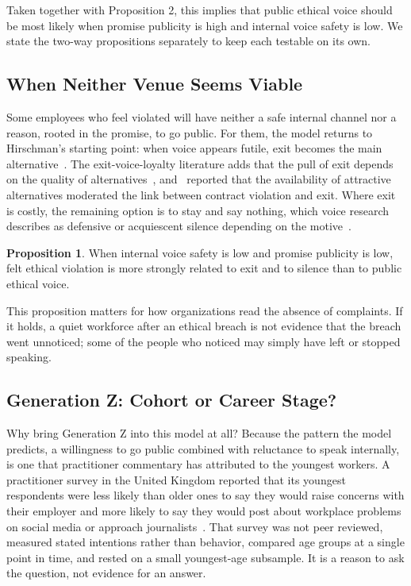 \documentclass[12pt,a4paper]{article}
\theoremstyle{definition}
\newtheorem{proposition}{Proposition}
\begin{document}
Taken together with Proposition 2, this implies that public ethical voice should be most likely when promise publicity is high and internal voice safety is low. We state the two-way propositions separately to keep each testable on its own.

\subsection{When Neither Venue Seems Viable}

Some employees who feel violated will have neither a safe internal channel nor a reason, rooted in the promise, to go public. For them, the model returns to Hirschman's starting point: when voice appears futile, exit becomes the main alternative~\citep{hirschman1970exit}. The exit-voice-loyalty literature adds that the pull of exit depends on the quality of alternatives~\citep{rusbult1988impact}, and~\citet{turnley1999impact} reported that the availability of attractive alternatives moderated the link between contract violation and exit. Where exit is costly, the remaining option is to stay and say nothing, which voice research describes as defensive or acquiescent silence depending on the motive~\citep{vandyne2003conceptualizing}.

\begin{proposition}
When internal voice safety is low and promise publicity is low, felt ethical violation is more strongly related to exit and to silence than to public ethical voice.
\end{proposition}

This proposition matters for how organizations read the absence of complaints. If it holds, a quiet workforce after an ethical breach is not evidence that the breach went unnoticed; some of the people who noticed may simply have left or stopped speaking.

\subsection{Generation Z: Cohort or Career Stage?}

Why bring Generation Z into this model at all? Because the pattern the model predicts, a willingness to go public combined with reluctance to speak internally, is one that practitioner commentary has attributed to the youngest workers. A practitioner survey in the United Kingdom reported that its youngest respondents were less likely than older ones to say they would raise concerns with their employer and more likely to say they would post about workplace problems on social media or approach journalists~\citep{protect2025talkin}. That survey was not peer reviewed, measured stated intentions rather than behavior, compared age groups at a single point in time, and rested on a small youngest-age subsample. It is a reason to ask the question, not evidence for an answer.
\end{document}
